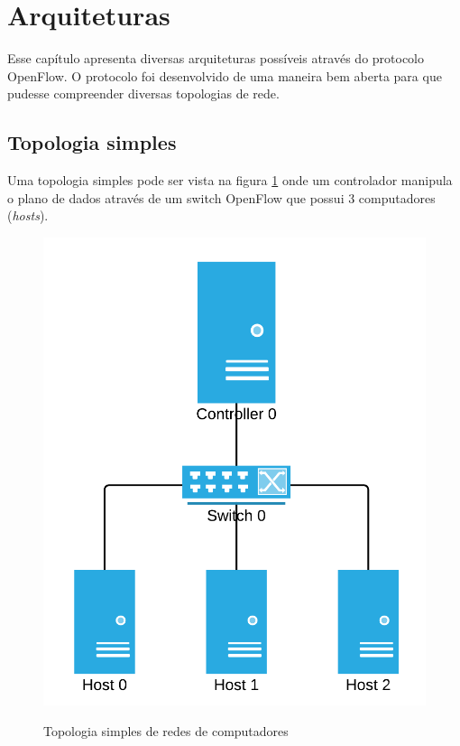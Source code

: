\section{Arquiteturas}

Esse capítulo apresenta diversas arquiteturas possíveis através do 
protocolo OpenFlow. 
O protocolo foi desenvolvido de uma maneira bem aberta para que pudesse 
compreender diversas topologias de rede. 

\subsection{Topologia simples}

Uma topologia simples pode ser vista na figura \ref{fig:simple-topology} onde
um controlador manipula o plano de dados através de um switch OpenFlow 
que possui 3 computadores (\emph{hosts}).

\begin{figure}[h!]
    \centering
    \includegraphics[scale=0.85]{img/simple-topology}
    \label{fig:simple-topology}
    \caption{Topologia simples de redes de computadores}
\end{figure}

